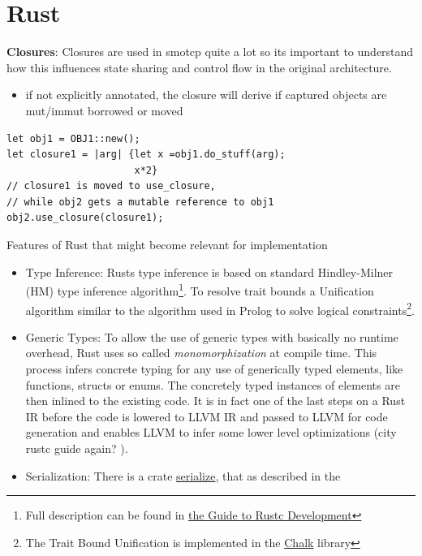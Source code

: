 \section{Rust}
\textbf{Closures}: Closures are used in smotcp quite a lot so its important to understand how this influences state sharing and control flow in the original architecture.
\begin{itemize}
    \item if not explicitly annotated, the closure will derive if captured objects are mut/immut borrowed or moved 
\end{itemize}
\begin{verbatim}
let obj1 = OBJ1::new();
let closure1 = |arg| {let x =obj1.do_stuff(arg);
                      x*2}
// closure1 is moved to use_closure, 
// while obj2 gets a mutable reference to obj1
obj2.use_closure(closure1);
\end{verbatim}

Features of Rust that might become relevant for implementation
\begin{itemize}
    \item Type Inference: Rusts type inference is based on standard Hindley-Milner (HM) type inference algorithm\footnote{Full description can be found in \href{https://rustc-dev-guide.rust-lang.org/about-this-guide.html}{the Guide to Rustc Development}}. To resolve trait bounds a Unification algorithm similar to the algorithm used in Prolog to solve logical constraints\footnote{The Trait Bound Unification is implemented in the \href{https://rust-lang.github.io/chalk/book/}{Chalk} library}.
    \item Generic Types: To allow the use of generic types with basically no runtime overhead, Rust uses so called \textit{monomorphization} at compile time. This process infers concrete typing for any use of generically typed elements, like functions, structs or enums. The concretely typed instances of elements are then inlined to the existing code. It is in fact one of the last steps on a Rust IR before the code is lowered to LLVM IR and passed to LLVM for code generation and enables LLVM to infer some lower level optimizations (city rustc guide again? ).
    \item Serialization: There is a crate \href{https://doc.rust-lang.org/nightly/nightly-rustc/rustc_serialize/index.html}{serialize}, that as described in the 
\end{itemize}



